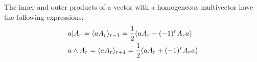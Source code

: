 \begin{lemma}\label{l:v-mv-product}
	The inner and outer products of a vector with a homogeneous multivector have the following expressions:
	\begin{align*}
		& a | A_r = \langle aA_r \rangle_{r-1} = \frac{1}{2}(aA_r-(-1)^rA_ra) \\
		& a \wedge A_r = \langle aA_r \rangle_{r+1} = \frac{1}{2}(aA_r+(-1)^rA_ra)
	\end{align*}
\end{lemma}
